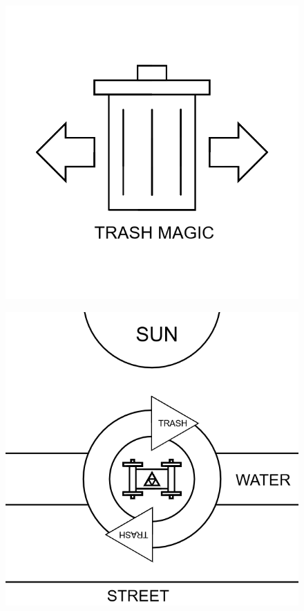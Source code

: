 \documentclass[17pt]{extreport}
\begin{document}
	\begin{figure}
		\centering
		\includegraphics[width=7.5in]{imageserver/uploadimages/image13.png}
	\end{figure}
	\begin{figure}
		\centering
		\includegraphics[width=7.5in]{imageserver/uploadimages/image14.png}
	\end{figure}
\end{document}
